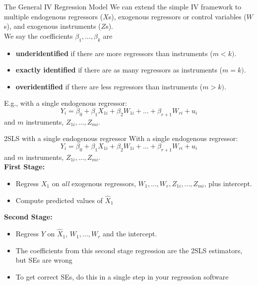 \documentclass[notes,10pt, aspectratio=169]{beamer}
\begin{document}
\begin{frame}{The General  IV  Regression Model }
We can extend the simple IV framework to multiple endogenous regressors ($X$s), exogenous regressors or control variables ($W$s), and exogenous instruments ($Z$s).\\[1em]
We say the coefficients $\beta_1, \dots, \beta_k$ are
\begin{itemize}
    \item \textbf{underidentified} if there are more regressors than instruments ($m<k)$.
    \item \textbf{exactly identified} if there are as many regressors as instruments ($m=k)$.
    \item \textbf{overidentified} if there are less regressors than instruments ($m>k)$.
\end{itemize}
\vspace{1em}
E.g., with a single endogenous regressor:
\begin{equation*}
    Y_i = \beta_0 + \beta_1 X_{1i} + \beta_2 W_{1i} + \dots + \beta_{r+1} W_{ri} + u_i
\end{equation*}
and $m$ instruments, $Z_{1i}, \dots,Z_{mi}$.
\end{frame}

\begin{frame}{2SLS with a single endogenous regressor}
With a single endogenous regressor:
\begin{equation*}
    Y_i = \beta_0 + \beta_1 X_{1i} + \beta_2 W_{1i} + \dots + \beta_{r+1} W_{ri} + u_i
\end{equation*}
and $m$ instruments, $Z_{1i}, \dots,Z_{mi}$.\\[1em]

\textbf{First Stage:}\\
\begin{itemize}
    \item Regress $X_{1}$ on \textit{all} exogenous regressors, $W_{1}, \dots, W_{r}, Z_{1i}, \dots,Z_{mi}$, plus intercept.
    \item Compute predicted values of $\hat{X}_1$
\end{itemize}
\vspace{1em}
\textbf{Second Stage:}\\
\begin{itemize}
    \item Regress $Y$ on $\hat{X}_1$, $W_{1}, \dots, W_{r}$ and the intercept.
    \item The coefficients from this second stage regression are the 2SLS estimators, but SEs are wrong
    \item To get correct SEs, do this in a single step in your regression software
\end{itemize}
\end{frame}
\end{document}
